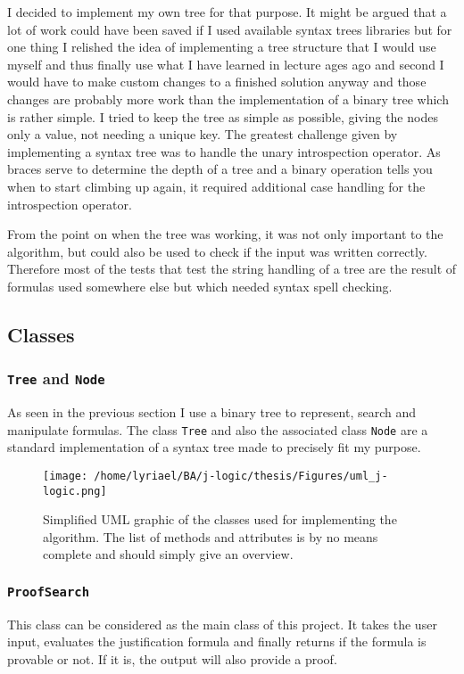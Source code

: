 I decided to implement my own tree for that purpose. It might be argued that a lot of work could have been saved if I used available syntax trees libraries but for one thing I relished the idea of implementing a tree structure that I would use myself and thus finally use what I have learned in lecture ages ago and second I would have to make custom changes to a finished solution anyway and those changes are probably more work than the implementation of a binary tree which is rather simple. I tried to keep the tree as simple as possible, giving the nodes only a value, not needing a unique key. The greatest challenge given by implementing a syntax tree was to handle the unary introspection operator. As braces serve to determine the depth of a tree and a binary operation tells you when to start climbing up again, it required additional case handling for the introspection operator. 

From the point on when the tree was working, it was not only important to the algorithm, but could also be used to check if the input was written correctly. Therefore most of the tests that test the string handling of a tree are the result of formulas used somewhere else but which needed syntax spell checking. 

\subsection{Classes}

\subsubsection[Tree and Node]{\texttt{Tree} and \texttt{Node}}
As seen in the previous section I use a binary tree to represent, search and manipulate formulas. The class \texttt{Tree} and also the associated class \texttt{Node} are a standard implementation of a syntax tree made to precisely fit my purpose. 

\begin{figure}[H]
	\caption{Simplified UML graphic of the classes used for implementing the algorithm. The list of methods and attributes is by no means complete and should simply give an overview.}
	\texttt{[image: /home/lyriael/BA/j-logic/thesis/Figures/uml\_j-logic.png]}
	\label{uml}
\end{figure}


\subsubsection[ProofSearch]{\texttt{ProofSearch}}
This class can be considered as the main class of this project. It takes the user input, evaluates the justification formula and finally returns if the formula is provable or not. If it is, the output will also provide a proof.

